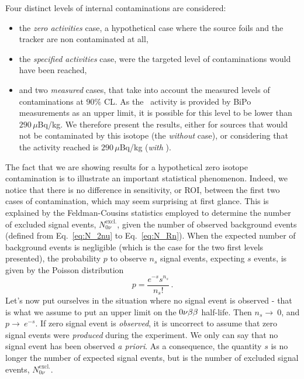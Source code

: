 Four distinct levels of internal contaminations are considered:
\begin{itemize}
\item the \emph{zero activities} case, a hypothetical case where the source foils and the tracker are non contaminated at all,
\item the \emph{specified activities} case, were the targeted level of contaminations would have been reached,
\item and two \emph{measured} cases, that take into account the measured levels of contaminations at $90\%$ CL.
  As the \Bi\ activity is provided by BiPo measurements as an upper limit, it is possible for this level to be lower than $290\,\mu$Bq/kg.
  We therefore present the results, either for sources that would not be contaminated by this isotope (the \emph{without \Bi} case), or considering that the activity reached is $290\,\mu$Bq/kg (\emph{with \Bi}).
\end{itemize}
The fact that we are showing results for a hypothetical zero isotope contamination is to illustrate an important statistical phenomenon.
Indeed, we notice that there is no difference in sensitivity, or ROI, between the first two cases of contamination, which may seem surprising at first glance. %
This is explained by the Feldman-Cousins statistics employed to determine the number of excluded signal events, $N_{0\nu}^{\text{excl.}}$, given the number of observed background events (defined from Eq.~\eqref{eq:N_2nu} to Eq.~\eqref{eq:N_Rn}).
When the expected number of background events is negligible (which is the case for the two first levels presented), the probability $p$ to observe $n_{s}$ signal events, expecting $s$ events, is given by the Poisson distribution
\begin{equation}
p = \frac{e^{-s}s^{n_{s}}}{n_{s}!}\,.
\end{equation}
Let's now put ourselves in the situation where no signal event is observed - that is what we assume to put an upper limit on the $0\nu\beta\beta$ half-life.
Then $n_{s}\rightarrow~0$, and $p\rightarrow~e^{-s}$.
If zero signal event is \emph{observed}, it is uncorrect to assume that zero signal events were \emph{produced} during the experiment.
We only can say that no signal event has been observed \emph{a priori}.
As a consequence, the quantity $s$ is no longer the number of expected signal events, but is the number of excluded signal events, $N_{0\nu}^{\text{excl.}}$.
